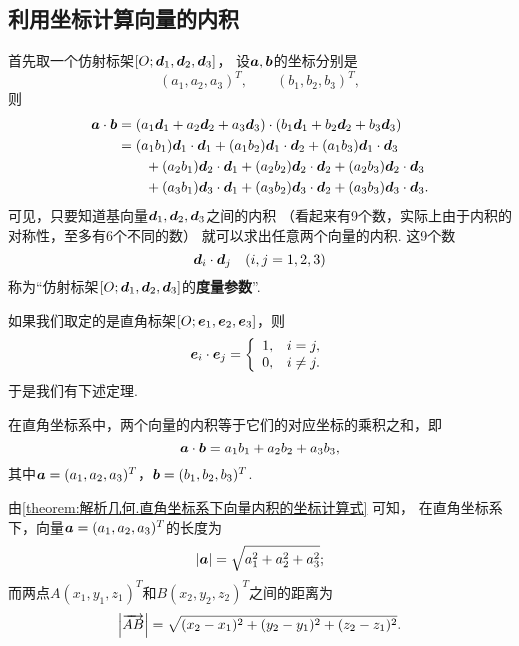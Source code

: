 \subsection{利用坐标计算向量的内积}
首先取一个仿射标架\([O;\boldsymbol{d}_1,\boldsymbol{d}_2,\boldsymbol{d}_3]\)，
设\(\boldsymbol{a},\boldsymbol{b}\)的坐标分别是\[
	(a_1,a_2,a_3)^T, \qquad
	(b_1,b_2,b_3)^T,
\]
则\begin{equation}
	\begin{split}
	\boldsymbol{a}\cdot\boldsymbol{b}
	&= (a_1 \boldsymbol{d}_1 + a_2 \boldsymbol{d}_2 + a_3 \boldsymbol{d}_3)
	\cdot (b_1 \boldsymbol{d}_1 + b_2 \boldsymbol{d}_2 + b_3 \boldsymbol{d}_3) \\
	&= (a_1 b_1) \boldsymbol{d}_1 \cdot \boldsymbol{d}_1
	+ (a_1 b_2) \boldsymbol{d}_1 \cdot \boldsymbol{d}_2
	+ (a_1 b_3) \boldsymbol{d}_1 \cdot \boldsymbol{d}_3 \\
	&\hspace{20pt}
	+ (a_2 b_1) \boldsymbol{d}_2 \cdot \boldsymbol{d}_1
	+ (a_2 b_2) \boldsymbol{d}_2 \cdot \boldsymbol{d}_2
	+ (a_2 b_3) \boldsymbol{d}_2 \cdot \boldsymbol{d}_3 \\
	&\hspace{20pt}
	+ (a_3 b_1) \boldsymbol{d}_3 \cdot \boldsymbol{d}_1
	+ (a_3 b_2) \boldsymbol{d}_3 \cdot \boldsymbol{d}_2
	+ (a_3 b_3) \boldsymbol{d}_3 \cdot \boldsymbol{d}_3.
	\end{split}
\end{equation}
可见，只要知道基向量\(\boldsymbol{d}_1,\boldsymbol{d}_2,\boldsymbol{d}_3\)之间的内积
（看起来有9个数，实际上由于内积的对称性，至多有6个不同的数）
就可以求出任意两个向量的内积.
这9个数\[
	\boldsymbol{d}_i \cdot \boldsymbol{d}_j
	\quad(i,j=1,2,3)
\]称为“仿射标架\([O;\boldsymbol{d}_1,\boldsymbol{d}_2,\boldsymbol{d}_3]\)的\textbf{度量参数}”.

如果我们取定的是直角标架\([O;\boldsymbol{e}_1,\boldsymbol{e}_2,\boldsymbol{e}_3]\)，则\[
	\boldsymbol{e}_i \cdot \boldsymbol{e}_j = \left\{ \begin{array}{ll}
		1, & i = j, \\
		0, & i \neq j.
	\end{array} \right.
\]
于是我们有下述定理.
\begin{theorem}\label{theorem:解析几何.直角坐标系下向量内积的坐标计算式}
在直角坐标系中，两个向量的内积等于它们的对应坐标的乘积之和，即
\begin{equation}
	\boldsymbol{a}\cdot\boldsymbol{b}
	= a_1 b_1 + a_2 b_2 + a_3 b_3,
\end{equation}
其中\(\boldsymbol{a}=(a_1,a_2,a_3)^T\)，\(\boldsymbol{b}=(b_1,b_2,b_3)^T\).
\end{theorem}

由\cref{theorem:解析几何.直角坐标系下向量内积的坐标计算式} 可知，
在直角坐标系下，向量\(\boldsymbol{a}=(a_1,a_2,a_3)^T\)的长度为\begin{equation}
	\abs{\boldsymbol{a}} = \sqrt{a_1^2+a_2^2+a_3^2};
\end{equation}
而两点\(A(x_1,y_1,z_1)^T\)和\(B(x_2,y_2,z_2)^T\)之间的距离为\begin{equation}
	\abs{\overrightarrow{AB}} = \sqrt{(x_2-x_1)^2+(y_2-y_1)^2+(z_2-z_1)^2}.
\end{equation}

